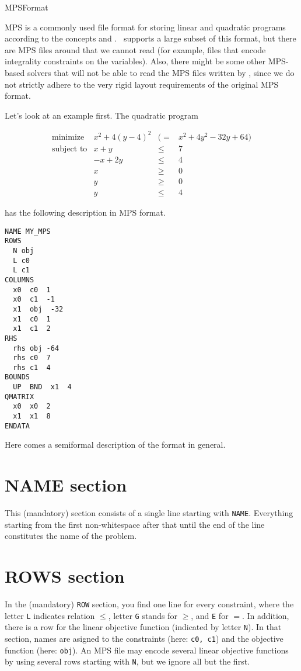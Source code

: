 \begin{ccRefConcept}{MPSFormat}

MPS is a commonly used file format for storing linear and quadratic 
programs according to the concepts  and 
. \cgal\ supports a large subset of
this format, but there are MPS files around that we cannot read (for
example, files that encode integrality constraints on the variables).
Also, there might be some other MPS-based solvers that will not be able 
to read the MPS files written by \cgal, since we do not strictly
adhere to the very rigid layout requirements of the original MPS 
format.

Let's look at an example first. The quadratic program 

\[
\begin{array}{lrcl}
\mbox{minimize}       & x^2 + 4(y-4)^2 &(=& x^2 + 4y^2 - 32y + 64) \\
\mbox{subject to}     & x + y &\leq& 7 \\
                      & -x + 2y &\leq& 4 \\
                      & x &\geq& 0 \\
                      & y &\geq& 0 \\
                      & y &\leq& 4
\end{array}
\]

has the following description in MPS format. 

\begin{verbatim}
NAME MY_MPS
ROWS
  N obj
  L c0
  L c1
COLUMNS
  x0  c0  1
  x0  c1  -1
  x1  obj  -32
  x1  c0  1
  x1  c1  2
RHS
  rhs obj -64
  rhs c0  7
  rhs c1  4
BOUNDS
  UP  BND  x1  4
QMATRIX
  x0  x0  2
  x1  x1  8
ENDATA
\end{verbatim}

Here comes a semiformal description of the format in general.

\section*{NAME section}
This (mandatory) section consists of a single line
starting with \texttt{NAME}. Everything starting from the
first non-whitespace after that until the end of the line
constitutes the name of the problem.

\section*{ROWS section}
In the (mandatory) \texttt{ROW} section, you find one line for every
constraint, where the letter \texttt{L} indicates relation $\leq$,
letter \texttt{G} stands for $\geq$, and \texttt{E} for $=$. In
addition, there is a row for the linear objective function (indicated
by letter \texttt{N}). In that section, names are asigned to the
constraints (here: \texttt{c0, c1}) and the objective function (here:
\texttt{obj}).  An MPS file may encode several linear objective
functions by using several rows starting with \texttt{N}, but we ignore
all but the first.


\end{ccRefConcept}
